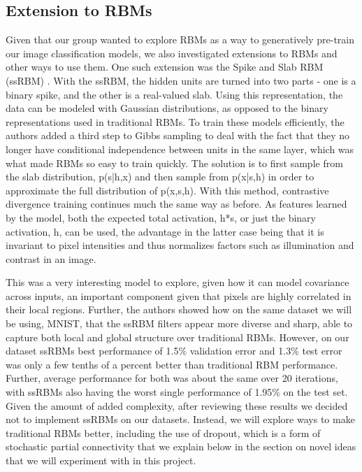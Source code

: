 \documentclass[12pt]{article}  %
\begin{document}
\subsection{Extension to RBMs}
\label{Extension to RBMs}
Given that our group wanted to explore RBMs as a way to generatively pre-train our image classification models, we also investigated extensions to RBMs and other ways to use them.  One such extension was the Spike and Slab RBM (ssRBM) \cite{ICML2011Courville_591}.  With the ssRBM, the hidden units are turned into two parts - one is a binary spike, and the other is a real-valued slab.  Using this representation, the data can be modeled with Gaussian distributions, as opposed to the binary representations used in traditional RBMs.  To train these models efficiently, the authors added a third step to Gibbs sampling to deal with the fact that they no longer have conditional independence between units in the same layer, which was what made RBMs so easy to train quickly.  The solution is to first sample from the slab distribution, p(s|h,x) and then sample from p(x|s,h) in order to approximate the full distribution of p(x,s,h).  With this method, contrastive divergence training continues much the same way as before.  As features learned by the model, both the expected total activation, h*s, or just the binary activation, h, can be used, the advantage in the latter case being that it is invariant to pixel intensities and thus normalizes factors such as illumination and contrast in an image.  

This was a very interesting model to explore, given how it can model covariance across inputs, an important component given that pixels are highly correlated in their local regions.  Further, the authors showed how on the same dataset we will be using, MNIST, that the ssRBM filters appear more diverse and sharp, able to capture both local and global structure over traditional RBMs.  However, on our dataset ssRBMs best performance of 1.5\% validation error and 1.3\% test error was only a few tenths of a percent better than traditional RBM performance.  Further, average performance for both was about the same over 20 iterations, with ssRBMs also having the worst single performance of 1.95\% on the test set.  Given the amount of added complexity, after reviewing these results we decided not to implement ssRBMs on our datasets.  Instead, we will explore ways to make traditional RBMs better, including the use of dropout, which is a form of stochastic partial connectivity that we explain below in the section on novel ideas that we will experiment with in this project.
\end{document}
